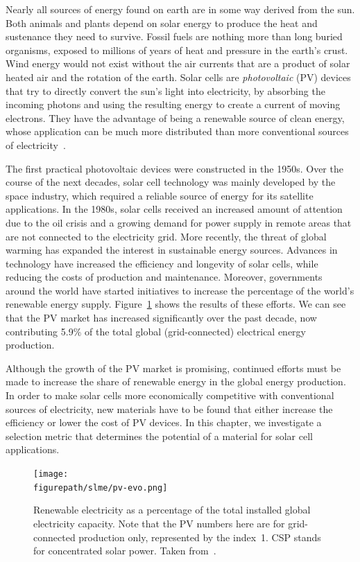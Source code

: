 \begin{refsection}
Nearly all sources of energy found on earth are in some way derived from the 
sun. Both animals and plants depend on solar energy to produce the heat and 
sustenance they need to survive. Fossil fuels are nothing more than long 
buried organisms, exposed to millions of years of heat and pressure in the 
earth's crust. Wind energy would not exist without the air currents that are a 
product of solar heated air and the rotation of the earth. Solar cells are 
\textit{photovoltaic} (PV) devices that try to directly convert the sun's 
light into electricity, by absorbing the incoming photons and using the 
resulting energy to create a current of moving electrons. They have the 
advantage of being a renewable source of clean energy, whose application can 
be much more distributed than more conventional sources of 
electricity~\cite{Marsden2011}. 
 
The first practical photovoltaic devices were constructed in the 1950s. Over 
the course of the next decades, solar cell technology was mainly developed by 
the space industry, which required a reliable source of energy for its 
satellite applications. In the 1980s, solar cells received an increased amount 
of attention due to the oil crisis and a growing demand for power supply in 
remote areas that are not connected to the electricity grid. More recently, 
the threat of global warming has expanded the interest in sustainable energy 
sources. Advances in technology have increased the efficiency and longevity of 
solar cells, while reducing the costs of production and maintenance. 
Moreover, governments around the world have started initiatives to increase the 
percentage of the world's renewable energy supply. 
Figure~\ref{slme:fig-pv_evo} shows the results of these efforts. We can see 
that the PV market has increased significantly over the past decade, now 
contributing 5.9\% of the total global (grid-connected) electrical energy production. 
 
Although the growth of the PV market is promising, continued efforts must be 
made to increase the share of renewable energy in the global energy 
production. In order to make solar cells more economically competitive with 
conventional sources of electricity, new materials have to be found that 
either increase the efficiency or lower the cost of PV devices. In this 
chapter, we investigate a selection metric that determines the potential of a 
material for solar cell applications. 
 
\begin{figure}[hb]  
\centering 
\texttt{[image: \\figurepath/slme/pv-evo.png]} 
\caption{Renewable electricity as a percentage of the total installed global 
electricity capacity. Note that the PV numbers here are for grid-connected production only, represented by the index~1. CSP stands for concentrated solar power. Taken from~\cite{NREL2017}.} 
\label{slme:fig-pv_evo}  
\end{figure} 


\end{refsection}
